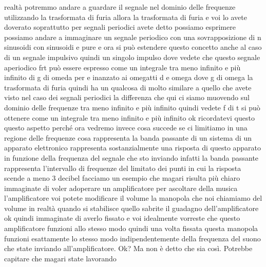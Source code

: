 realtà potremmo andare a guardare il segnale nel dominio delle frequenze utilizzando la trasformata di furia allora la trasformata di furia e voi lo avete doverato soprattutto per segnali periodici avete detto possiamo esprimere possiamo andare a immaginare un segnale periodico con una sovrapposizione di n sinusoidi con sinusoidi e pure e ora si può estendere questo concetto anche al caso di un segnale impulsivo quindi un singolo impulso dove vedete che questo segnale aperiodico frt può essere espresso come un integrale tra meno infinito e più infinito di g di omeda per e inanzato ai omegatti d e omega dove g di omega la trasformata di furia quindi ha un qualcosa di molto similare a quello che avete visto nel caso dei segnali periodici la differenza che qui ci siamo muovendo sul dominio delle frequenze tra meno infinito e più infinito quindi vedete f di t si può ottenere come un integrale tra meno infinito e più infinito ok ricordatevi questo questo aspetto perché ora vedremo invece cosa succede se ci limitiamo in una regione delle frequenze cosa rappresenta la banda passante di un sistema di un apparato elettronico rappresenta sostanzialmente una risposta di questo apparato in funzione della frequenza del segnale che sto inviando infatti la banda passante rappresenta l'intervallo di frequenze del limitato dei punti in cui la risposta scende a meno 3 decibel facciamo un esempio che magari risulta più chiaro immaginate di voler adoperare un amplificatore per ascoltare della musica l'amplificatore voi potete modificare il volume la manopola che noi chiamiamo del volume in realtà quando si stabilisce quello sabrite il guadagno dell'amplificatore ok quindi immaginate di averlo fissato e voi idealmente vorreste che questo amplificatore funzioni allo stesso modo quindi una volta fissata questa manopola funzioni esattamente lo stesso modo indipendentemente della frequenza del suono che state inviando all'amplificatore. Ok? Ma non è detto che sia così. Potrebbe capitare che magari state lavorando 

